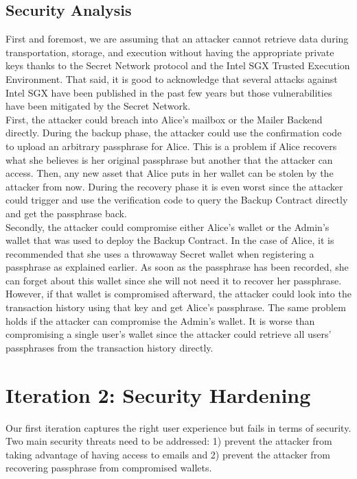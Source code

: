 \documentclass[runningheads]{llncs}
\begin{document}
\subsection{Security Analysis}

First and foremost, we are assuming that an attacker cannot retrieve data during transportation, storage, and execution without having the appropriate private keys thanks to the Secret Network protocol and the Intel SGX Trusted Execution Environment. That said, it is good to acknowledge that several attacks against Intel SGX have been published in the past few years \cite{gotzfried2017cache,nilsson2020survey,murdock2020plundervolt,biondo2018guard} but those vulnerabilities have been mitigated by the Secret Network. \\

First, the attacker could breach into Alice's mailbox or the Mailer Backend directly. During the backup phase, the attacker could use the confirmation code to upload an arbitrary passphrase for Alice. This is a problem if Alice recovers what she believes is her original passphrase but another that the attacker can access. Then, any new asset that Alice puts in her wallet can be stolen by the attacker from now. During the recovery phase it is even worst since the attacker could trigger and use the verification code to query the Backup Contract directly and get the passphrase back. \\

Secondly, the attacker could compromise either Alice's wallet or the Admin's wallet that was used to deploy the Backup Contract. In the case of Alice, it is recommended that she uses a throwaway Secret wallet when registering a passphrase as explained earlier. As soon as the passphrase has been recorded, she can forget about this wallet since she will not need it to recover her passphrase. However, if that wallet is compromised afterward, the attacker could look into the transaction history using that key and get Alice's passphrase. The same problem holds if the attacker can compromise the Admin's wallet. It is worse than compromising a single user's wallet since the attacker could retrieve all users' passphrases from the transaction history directly. 

\section{Iteration 2: Security Hardening}
\label{iteration2}

Our first iteration captures the right user experience but fails in terms of security. Two main security threats need to be addressed: 1) prevent the attacker from taking advantage of having access to emails and 2) prevent the attacker from recovering passphrase from compromised wallets. 
\end{document}
